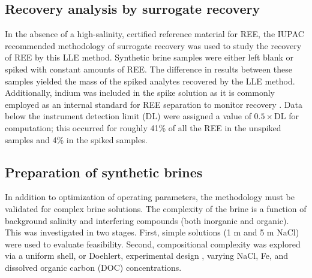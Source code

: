 \subsection{Recovery analysis by surrogate recovery}

In the absence of a high-salinity, certified reference material for REE, the IUPAC recommended methodology of surrogate recovery \citep{IUPAC} was used to study the recovery of REE by this LLE method.
Synthetic brine samples were either left blank or spiked with constant amounts of REE.
The difference in results between these samples yielded the mass of the spiked analytes recovered by the LLE method.
Additionally, indium was included in the spike solution as it is commonly employed as an internal standard for REE separation to monitor recovery \citep{Shabani_AC_1990,Zawisza_JAAS_2011}.
Data below the instrument detection limit (DL) were assigned a value of $0.5\times$DL for computation; this occurred for roughly 41\% of all the REE in the unspiked samples and 4\% in the spiked samples.

\subsection{Preparation of synthetic brines}

In addition to optimization of operating parameters, the methodology must be validated for complex brine solutions.
The complexity of the brine is a function of background salinity and interfering compounds (both inorganic and organic).
This was investigated in two stages.
First, simple solutions (1 m and 5 m NaCl) were used to evaluate feasibility.
Second, compositional complexity was explored via a uniform shell, or Doehlert, experimental design \citep{Doehlert}, varying NaCl, Fe, and dissolved organic carbon (DOC) concentrations.

